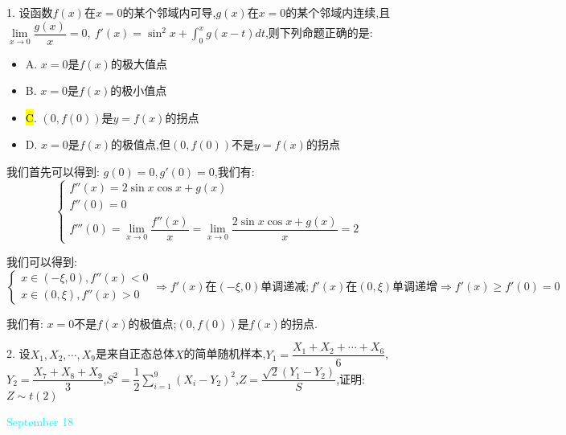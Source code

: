 1. 设函数$f(x)$在$x=0$的某个邻域内可导,$g(x)$在$x=0$的某个邻域内连续,且$\lim\limits_{x\to 0}\dfrac{g(x)}{x}=0,\ f'(x)=\sin^2 x+\int_{0}^{x}g(x-t)dt$,则下列命题正确的是:  
\begin{itemize}
	\item A. $x=0$是$f(x)$的极大值点
	\item B. $x=0$是$f(x)$的极小值点
	\item \hl{C}. $(0,f(0))$是$y=f(x)$的拐点
	\item D. $x=0$是$f(x)$的极值点,但$(0,f(0))$不是$y=f(x)$的拐点
\end{itemize}
\begin{solution}

	我们首先可以得到:  $g(0)=0,g'(0)=0$,我们有:  
	$$\left\lbrace
	\begin{array}{l}
		f''(x)=2\sin x\cos x+g(x)\\
		f''(0)=0\\
		f'''(0)=\lim\limits_{x\to 0}\dfrac{f''(x)}{x}=\lim\limits_{x\to 0}\dfrac{2\sin x\cos x+g(x)}{x}=2
	\end{array}
	\right. $$
	
	我们可以得到:  $$\left\lbrace
	\begin{array}{l}
		x\in(-\xi,0),f''(x)<0\\
		x\in(0,\xi),f''(x)>0
	\end{array}
	\right. \Rightarrow f'(x)\text{在}(-\xi,0)\text{单调递减};f'(x)\text{在}(0,\xi)\text{单调递增}\Rightarrow f'(x)\geq f'(0)=0$$
	
	我们有:  $x=0$不是$f(x)$的极值点;$(0,f(0))$是$f(x)$的拐点.
\end{solution}

2. 设$X_{1},X_{2},\cdots,X_{9}$是来自正态总体$X$的简单随机样本,$Y_{1}=\dfrac{X_{1}+X_{2}+\cdots+X_{6}}{6}$,$Y_{2}=\dfrac{X_{7}+X_{8}+X_{9}}{3}$,$S^2=\dfrac{1}{2}\sum\limits_{i=1}^{9}(X_{i}-Y_{2})^2$,$Z=\dfrac{\sqrt{2}(Y_{1}-Y_{2})}{S}$,证明:  $Z\sim t(2)$
\begin{solution}
	
\end{solution}

\textcolor{cyan}{September 18}

